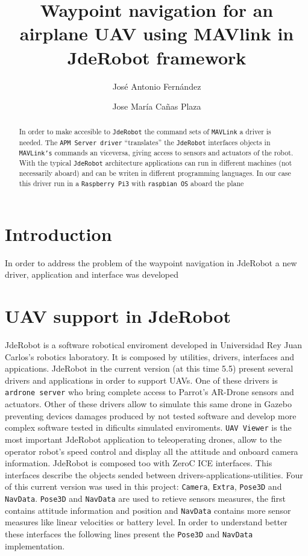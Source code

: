 \documentclass{llncs}
\begin{document}
\title{Waypoint navigation for an airplane UAV using MAVlink in JdeRobot framework}
\author{José Antonio Fernández \and Jose María Cañas Plaza}
\maketitle

\begin{abstract}
In order to make accesible to \texttt{JdeRobot} the command sets of \texttt{MAVLink} a driver is needed. The \texttt{APM Server driver} ``translates'' the \texttt{JdeRobot} interfaces objects in \texttt{MAVLink's} commands an viceversa, giving access to sensors and actuators of the robot. With the typical \texttt{JdeRobot} architecture applications can run in different machines (not necessarily aboard) and can be writen in different programming languages. 
In our case this driver run in a \texttt{Raspberry Pi3} with \texttt{raspbian OS} aboard the plane
\end{abstract}

\section{Introduction}

In order to address the problem of the waypoint navigation in JdeRobot a new driver, application and interface was developed  

\section{UAV support in JdeRobot}

JdeRobot is a software robotical enviroment developed in Universidad
Rey Juan Carlos's robotics laboratory. It is composed by utilities, drivers, interfaces and appications.
JdeRobot in the current version (at this time 5.5) present several drivers and applications in order to support UAVs.
One of these drivers is \texttt{ardrone server} who bring complete access to Parrot's AR-Drone sensors and actuators. Other of these drivers allow to simulate this same drone in Gazebo preventing devices damages produced by not tested software and develop more complex software tested in dificults simulated enviroments.
\texttt{UAV Viewer} is the most important JdeRobot application to teleoperating drones, allow to the operator robot's speed control and display all the attitude and onboard camera information.
JdeRobot is composed too with ZeroC ICE interfaces. This interfaces describe the objects sended between drivers-applications-utilities. Four of this current version was used in this project: \texttt{Camera}, \texttt{Extra}, \texttt{Pose3D} and \texttt{NavData}. \texttt{Pose3D} and \texttt{NavData} are used to retieve sensors measures, the first contains attitude information and position and \texttt{NavData} contains more sensor measures like linear velocities or battery level. In order to understand better these interfaces the following lines present the \texttt{Pose3D} and \texttt{NavData} implementation.
\end{document}
